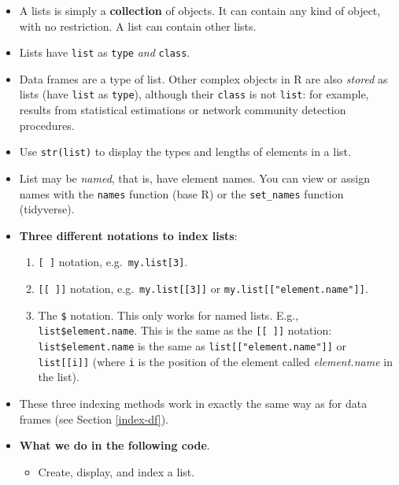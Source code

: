 \documentclass[
]{book}
\providecommand{\tightlist}{%
  \setlength{\itemsep}{0pt}\setlength{\parskip}{0pt}}
\begin{document}
\begin{itemize}
\tightlist
\item
  A lists is simply a \textbf{collection} of objects. It can contain any kind of object, with no restriction. A list can contain other lists.
\item
  Lists have \texttt{list} as \texttt{type} \emph{and} \texttt{class}.
\item
  Data frames are a type of list. Other complex objects in R are also \emph{stored} as lists (have \texttt{list} as \texttt{type}), although their \texttt{class} is not \texttt{list}: for example, results from statistical estimations or network community detection procedures.
\item
  Use \texttt{str(list)} to display the types and lengths of elements in a list.
\item
  List may be \emph{named}, that is, have element names. You can view or assign names with the \texttt{names} function (base R) or the \texttt{set\_names} function (tidyverse).
\item
  \textbf{Three different notations to index lists}:

  \begin{enumerate}
  \def\labelenumi{\arabic{enumi}.}
  \tightlist
  \item
    \texttt{{[}\ {]}} notation, e.g.~\texttt{my.list{[}3{]}}.
  \item
    \texttt{{[}{[}\ {]}{]}} notation, e.g.~\texttt{my.list{[}{[}3{]}{]}} or \texttt{my.list{[}{[}"element.name"{]}{]}}.
  \item
    The \texttt{\$} notation. This only works for named lists. E.g., \texttt{list\$element.name}. This is the same as the \texttt{{[}{[}\ {]}{]}} notation: \texttt{list\$element.name} is the same as \texttt{list{[}{[}"element.name"{]}{]}} or \texttt{list{[}{[}i{]}{]}} (where \texttt{i} is the position of the element called \emph{element.name} in the list).
  \end{enumerate}
\item
  These three indexing methods work in exactly the same way as for data frames (see Section \ref{index-df}).
\item
  \textbf{What we do in the following code}.

  \begin{itemize}
  \tightlist
  \item
    Create, display, and index a list.
  \end{itemize}
\end{itemize}
\end{document}

